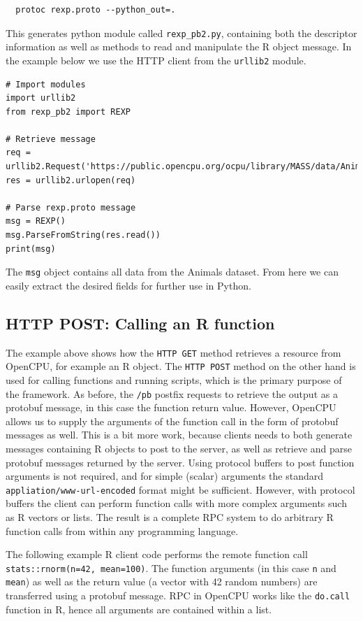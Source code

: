 \documentclass[article]{jss}
\begin{document}
\begin{verbatim}
  protoc rexp.proto --python_out=.
\end{verbatim}
This generates python module called \texttt{rexp\_pb2.py}, containing both the 
descriptor information as well as methods to read and manipulate the R object 
message. In the example below we use the HTTP client from the \texttt{urllib2}
module. 

\begin{verbatim}
# Import modules
import urllib2
from rexp_pb2 import REXP

# Retrieve message
req = urllib2.Request('https://public.opencpu.org/ocpu/library/MASS/data/Animals/pb')
res = urllib2.urlopen(req)
        
# Parse rexp.proto message
msg = REXP()
msg.ParseFromString(res.read())
print(msg)
\end{verbatim}
The \texttt{msg} object contains all data from the Animals dataset. From here we
can easily extract the desired fields for further use in Python.


\subsection{HTTP POST: Calling an R function}

The example above shows how the \texttt{HTTP GET} method retrieves a 
resource from OpenCPU, for example an R object. The \texttt{HTTP POST} 
method on the other hand is used for calling functions and running scripts, 
which is the primary purpose of the framework. As before, the \texttt{/pb} 
postfix requests to retrieve the output as a protobuf message, in this
case the function return value. However, OpenCPU allows us to supply the
arguments of the function call in the form of protobuf messages as well.
This is a bit more work, because clients needs to both generate messages 
containing R objects to post to the server, as well as retrieve and parse
protobuf messages returned by the server. Using protocol buffers to post
function arguments is not required, and for simple (scalar) arguments 
the standard \texttt{appliation/www-url-encoded} format might be sufficient.
However, with protocol buffers the client can perform function calls with
more complex arguments such as R vectors or lists. The result is a complete
RPC system to do arbitrary R function calls from within 
any programming language.

The following example R client code performs the remote function call 
\texttt{stats::rnorm(n=42, mean=100)}. The function arguments (in this
case \texttt{n} and \texttt{mean}) as well as the return value (a vector
with 42 random numbers) are transferred using a protobuf message. RPC in
OpenCPU works like the \texttt{do.call} function in R, hence all arguments
are contained within a list.
\end{document}
